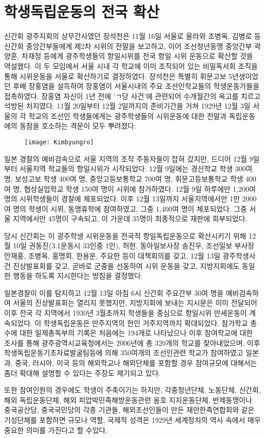 \section{학생독립운동의 전국 확산}
신간회 광주지회의 상무간사였던 장석천은 11월 16일 서울로 올라와 조병옥, 김병로 등 신간회 중앙간부들에게 제2차 시위의 전말을 보고하고, 이어 조선청년동맹 중앙간부 곽양훈, 차재정 등에게 광주학생들의 항일시위를 전국 항일 시위 운동으로 확산할 것을 역설했다. 이 두 모임에서 서울 시내 각 학교에 이미 조직되어 있는 비밀독서회 조직을 통해 시위운동을 서울로 확산하기로 결정하였다. 장석천은 특별히 휘문고보 5년생이었던 후배 장홍염을 설득하여 장홍염이 서울시내의 주요 조선인학교들의 학생운동가들을 접촉하였다. 장홍염 자신이 1년 전에 'ㄱ당 사건'에 관련되어 수개월간의 옥고를 치르고 석방된 처지였다. 11월 20일부터 12월 2일까지의 준비기간을 거쳐 1929년 12월 3일 서울의 각 학교의 조선인 학생들에게는 광주학생들의 시위운동에 대한 전말과 독립운동에의 동참을 호소하는 격문이 모두 뿌려졌다.

\begin{figure}
\texttt{[image: Kimbyungro]}
\end{figure}

일본 경찰의 예비검속으로 서울 지역의 조직 주동자들이 잡혀 갔지만, 드디어 12월 9일부터 서울지역 학교들의 항일시위가 시작되었다. 12월 9일에는 경신학교 학생 300여 명, 보성고보 학생 400여 명, 중앙고등보통학교 700여 명, 휘문고등보통학교 학생 400여 명, 협성실업학교 학생 150여 명이 시위에 참가하였다. 12월 9일 하루에만 1,200여 명의 시위학생들이 경찰에 체포되었다. 이후 12월 13일까지 서울지역에서만 1만 2000여 명의 학생이 시위, 동맹휴학에 참여하였고, 그중 1,400여 명이 체포되었다. 그중 서울 지역에서만 45명이 구속되고, 이 가운데 35명이 최종적으로 재판에 회부되었다.

당시 신간회는 이 광주학생 시위운동을 전국적 항일독립운동으로 확산시키기 위해 12월 10일 권동진(3.1운동시 33인중 1인), 허헌, 동아일보사장 송진우, 조선일보 부사장 안재홍, 조병옥, 홍명희, 한용운, 주요한 등이 대책회의를 갖고, 12월 13일 광주학생사건 진상발표회를 갖고, 곧바로 군중을 선동하여 시위 운동을 갖고, 지방지회에도 동일한 행동을 하도록 지시한다는 방침을 결정했다.

일본경찰이 이를 탐지하고 12월 13일 아침 6시 신간회 주요간부 30여 명을 예비검속하여 서울의 진상발표회는 열리지 못했지만, 지방지회에 보내는 지시문은 이미 전달되어 이후 전국 각 지역에서 1930년 3월초까지 학생들을 중심으로 항일시위 만세운동이 계속되었다. 이 학생독립운동은 만주지역의 한인 거주지역까지 확대되었다. 참가학교 총수에 대한 일제총독부의 기록은 처음에는 194개로 나타났으나 이후 참여학교에 대한 조사를 통해 광주광역시교육청에서는 2006년에 총 320개의 학교를 찾아내었으며, 이후 학생독립운동기초자료발굴팀등에 의해 350여개의 조선인관련 학교가 참여하였고 일본과, 중국, 러시아, 미국 등의 해외학교나 해외단체를 포함할 경우 참여규모에 대해서는 좀더 확대해 설명할 수 있다는 주장도 제기되고 있다.

또한 참여인원의 경우에도 학생이 주축이기는 하지만, 각종청년단체, 노동단체, 신간회, 해외 독립운동단체, 해외 피압박민족해방운동관련 옹호 지지운동단체, 반제동맹이나 중국공산당, 중국국민당의 각종 기관들, 해외조선인들이 만든 재만한족연합회와 같은 기성단체를 포함하면 규모나 역할, 국제적 성격은 1929년 세계정치의 역사 속에서 매우 중요한 의미를 가진다고 할 수있다.
